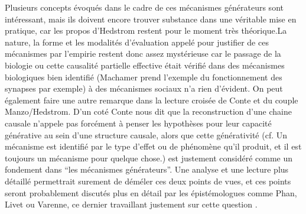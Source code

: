 

Plusieurs concepts évoqués dans le cadre de ces mécanismes générateurs sont intéressant, mais ils doivent encore trouver substance dans une véritable mise en pratique, car les propos d'Hedstrom restent pour le moment très théorique.La nature, la forme et les modalités d'évaluation appelé pour justifier de ces mécanismes par l'empirie restent donc assez mystérieuse car le passage de la biologie ou cette causalité partielle effective était vérifié dans des mécanismes biologiques bien identifié (Machamer prend l'exemple du fonctionnement des synapses par exemple) à des mécanismes sociaux n'a rien d'évident. On peut également faire une autre remarque dans la lecture croisée de Conte et du couple Manzo/Hedstrom. D'un coté Conte nous dit que la reconstruction d'une chaine causale n'appele pas forcément à penser les hypothèses pour leur capacité générative au sein d'une structure causale, alors que cette générativité (cf. Un mécanisme est identifié par le type d'effet ou de phénomène qu'il produit, et il est toujours un mécanisme pour quelque chose.) est justement considéré comme un fondement dans \enquote{les mécanismes générateurs}. Une analyse et une lecture plus détaillé permettrait surement de déméler ces deux points de vues, et ces points seront probablement discutés plus en détail par les épistémologues comme Phan, Livet ou Varenne, ce dernier travaillant justement sur cette question \autocite{Varenne2014}. 

